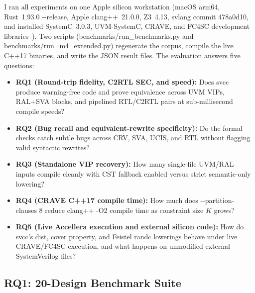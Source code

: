 \documentclass[conference]{IEEEtran}
\newcommand{\code}[1]{{\fontshape{n}\ttfamily #1}}
\begin{document}
I ran all experiments on one Apple silicon workstation (macOS arm64, Rust~1.93.0 \code{-{}-release}, Apple \code{clang++}~21.0.0, Z3~4.13, \code{svlang} commit \code{478a0d10}, and installed SystemC~3.0.3, UVM-SystemC, CRAVE, and FC4SC \code{development} libraries~\cite{kubavat2026scbench}). Two scripts (\code{benchmarks/run\_benchmarks.py} and \code{benchmarks/run\_m4\_extended.py}) regenerate the corpus, compile the live C++17 binaries, and write the JSON result files. The evaluation answers five questions:
\begin{itemize}
\item \textbf{RQ1 (Round-trip fidelity, C2RTL SEC, and speed):} Does \code{svcc} produce warning-free code and prove equivalence across UVM VIPs, RAL+SVA blocks, and pipelined RTL/C2RTL pairs at sub-millisecond compile speeds?
\item \textbf{RQ2 (Bug recall and equivalent-rewrite specificity):} Do the formal checks catch subtle bugs across CRV, SVA, UCIS, and RTL without flagging valid syntactic rewrites?
\item \textbf{RQ3 (Standalone VIP recovery):} How many single-file UVM/RAL inputs compile cleanly with CST fallback enabled versus strict semantic-only lowering?
\item \textbf{RQ4 (CRAVE C++17 compile time):} How much does \code{-{}-partition-clauses 8} reduce \code{clang++ -O2} compile time as constraint size $K$ grows?
\item \textbf{RQ5 (Live Accellera execution and external silicon code):} How do \code{svcc}'s \code{dist}, \code{cover property}, and Feistel \code{randc} lowerings behave under live CRAVE/FC4SC execution, and what happens on unmodified external SystemVerilog files?
\end{itemize}

\subsection{RQ1: 20-Design Benchmark Suite}
\end{document}
